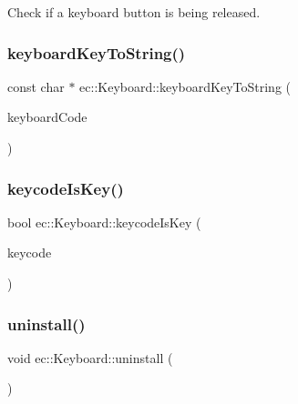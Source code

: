 Check if a keyboard button is being released. \mbox{\label{classec_1_1_keyboard_a5e986024ce4790af20b3198abce9b807}} 
\subsubsection{\texorpdfstring{keyboard\+Key\+To\+String()}{keyboardKeyToString()}}
{\footnotesize\ttfamily const char $\ast$ ec\+::\+Keyboard\+::keyboard\+Key\+To\+String (\begin{DoxyParamCaption}\item[{\mbox{\hyperlink{classec_1_1_keyboard_a135ca08df15aebf8c93ce3cc76288a6e}{E\+C\+\_\+\+K\+E\+Y\+\_\+\+K\+E\+Y\+B\+O\+A\+RD}}}]{keyboard\+Code }\end{DoxyParamCaption})\hspace{0.3cm}{\ttfamily [static]}}

\mbox{\label{classec_1_1_keyboard_a8d048694060edbbb3cd6dba19d7eff24}} 
\subsubsection{\texorpdfstring{keycode\+Is\+Key()}{keycodeIsKey()}}
{\footnotesize\ttfamily bool ec\+::\+Keyboard\+::keycode\+Is\+Key (\begin{DoxyParamCaption}\item[{int}]{keycode }\end{DoxyParamCaption})\hspace{0.3cm}{\ttfamily [static]}}

\mbox{\label{classec_1_1_keyboard_a1e60401ed958ec3d94a77b1dda9f44e8}} 
\subsubsection{\texorpdfstring{uninstall()}{uninstall()}}
{\footnotesize\ttfamily void ec\+::\+Keyboard\+::uninstall (\begin{DoxyParamCaption}{ }\end{DoxyParamCaption})}

